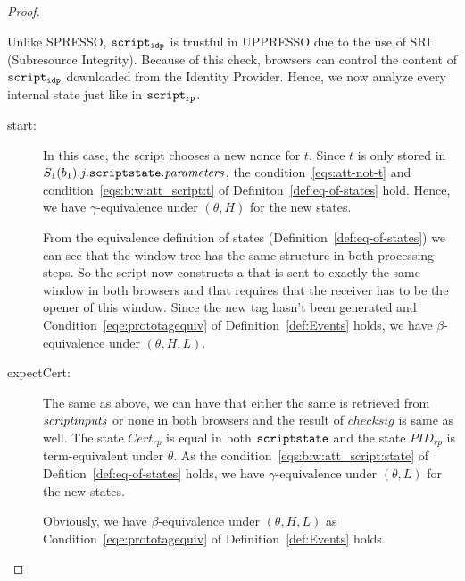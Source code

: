 \begin{proof}
\begin{description}
\begin{description}
\begin{enumerate}
            Unlike SPRESSO, $\mathtt{script_{idp}}$ is trustful in
            UPPRESSO due to the use of SRI (Subresource Integrity).
            Because of this check, browsers can control the 
            content of $\mathtt{script_{idp}}$ downloaded from 
            the Identity Provider. Hence, we now analyze every 
            internal state just like in $\mathtt{script_{rp}}$.
  
            \begin{description}
            \item[start:] In this case, the script chooses a
              new nonce for $t$. Since $t$ is only stored in
              $S_1(b_1).j.\mathtt{scriptstate}.\mathit{parameters}$,
              the condition~\ref{eqs:att-not-t} and 
              condition~\ref{eqs:b:w:att_script:t} of 
              Definiton~\ref{def:eq-of-states} hold. Hence, 
              we have $\gamma$-equivalence under $(\theta,H)$ 
              for the new states.
  
              From the equivalence definition of states
              (Definition~\ref{def:eq-of-states}) we can see 
              that the window tree has the same structure in 
              both processing steps. 
              So the script now constructs a \pm that is sent to 
              exactly the same window in both browsers and that 
              requires that the receiver has to be the opener
              of this window. Since the new tag hasn't been 
              generated and Condition~\ref{eqe:prototagequiv} 
              of Definition~\ref{def:Events} holds, we have 
              $\beta$-equivalence under $(\theta,H,L)$.
            \item[expectCert:] The same as above, we can have 
              that either the same \pm is retrieved from 
              $\mathit{scriptinputs}$ or none in both browsers and 
              the result of $checksig$ is same as well. The 
              state $Cert_{rp}$ is equal in both 
              $\mathtt{scriptstate}$ and the state $PID_{rp}$ is
              term-equivalent under $\theta$. As the 
              condition~\ref{eqs:b:w:att_script:state} of 
              Defition~\ref{def:eq-of-states} holds, we have 
              $\gamma$-equivalence under $(\theta,L)$ for the 
              new states.
  
              Obviously, we have $\beta$-equivalence under 
              $(\theta,H,L)$ as Condition~\ref{eqe:prototagequiv} 
              of Definition~\ref{def:Events} holds.
  

\end{description}
\end{enumerate}
\end{description}
\end{description}
\end{proof}
